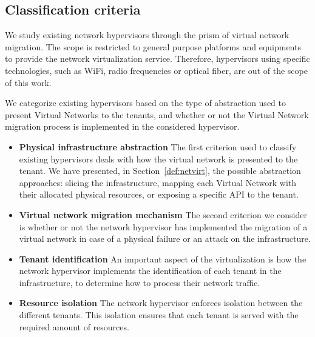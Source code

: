 \subsection{Classification criteria}
We study existing network hypervisors through the prism of virtual network migration.
The scope is restricted to general purpose platforms and equipments to provide the network virtualization service. Therefore, hypervisors using specific technologies, such as WiFi, radio frequencies or optical fiber, are out of the scope of this work.

We categorize existing hypervisors based on the type of abstraction used to present Virtual Networks to the tenants, and whether or not the Virtual Network migration process is implemented in the considered hypervisor.

\begin{itemize}
\item \textbf{Physical infrastructure abstraction}
The first criterion used to classify existing hypervisors deals with how the virtual network is presented to the tenant. We have presented, in Section~\ref{def:netvirt}, the possible abstraction approaches: slicing the infrastructure, mapping each Virtual Network with their allocated physical resources, or exposing a specific API to the tenant.

\item \textbf{Virtual network migration mechanism}
The second criterion we consider is whether or not the network hypervisor has implemented the migration of a virtual network in case of a physical failure or an attack on the infrastructure.

\item \textbf{Tenant identification}
An important aspect of the virtualization is how the network hypervisor implements the identification of each tenant in the infrastructure, to determine how to process their network traffic.

\item \textbf{Resource isolation}
The network hypervisor enforces isolation between the different tenants.
This isolation ensures that each tenant is served with the required amount of resources.
\end{itemize}
